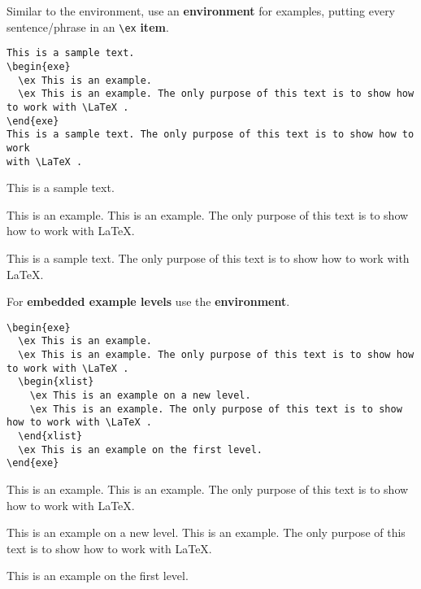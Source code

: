 \begin{frame}[fragile]

Similar to the  environment, use an \textbf{ environment} for examples, putting every sentence/phrase in an \lstinline|\ex| \textbf{item}.

{\footnotesize 
\begin{lstlisting}
This is a sample text. 
\begin{exe}
  \ex This is an example.
  \ex This is an example. The only purpose of this text is to show how to work with \LaTeX .
\end{exe}	
This is a sample text. The only purpose of this text is to show how to work 
with \LaTeX .
\end{lstlisting}
}


This is a sample text. 
\begin{exe}
\ex This is an example.
\ex This is an example. The only purpose of this text is to show how to work with \LaTeX .
\end{exe}	
This is a sample text. The only purpose of this text is to show how to work with \LaTeX .
\end{frame}


\begin{frame}[fragile]

For \textbf{embedded example levels} use the  \textbf{environment}.

{\footnotesize 
\begin{lstlisting}
\begin{exe}
  \ex This is an example.
  \ex This is an example. The only purpose of this text is to show how to work with \LaTeX .
  \begin{xlist}
    \ex This is an example on a new level.
    \ex This is an example. The only purpose of this text is to show how to work with \LaTeX .
  \end{xlist}		
  \ex This is an example on the first level.
\end{exe}	
\end{lstlisting}
}


\begin{exe}
	\ex This is an example.
	\ex This is an example. The only purpose of this text is to show how to work with \LaTeX .
	\begin{xlist}
		\ex This is an example on a new level.
		\ex This is an example. The only purpose of this text is to show how to work with \LaTeX .
	\end{xlist}		
	\ex This is an example on the first level.
\end{exe}	

\end{frame}


